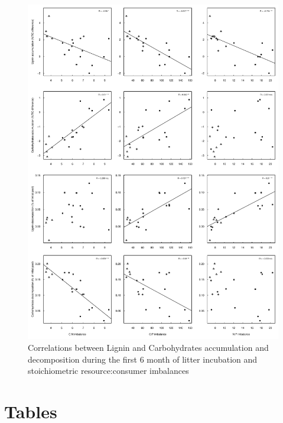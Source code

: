 \documentclass[10pt]{article}
\begin{document}
\newpage
\begin{figure}[h!]
\vspace*{2mm}
\begin{center}
\includegraphics{plosone-graphcorr3}
\end{center}
\caption{Correlations between Lignin and Carbohydrates accumulation and decomposition during the first 6 month of litter incubation and stoichiometric resource:consumer imbalances}
\label{fig:cor3}
\end{figure}


\section*{Tables}
\end{document}
